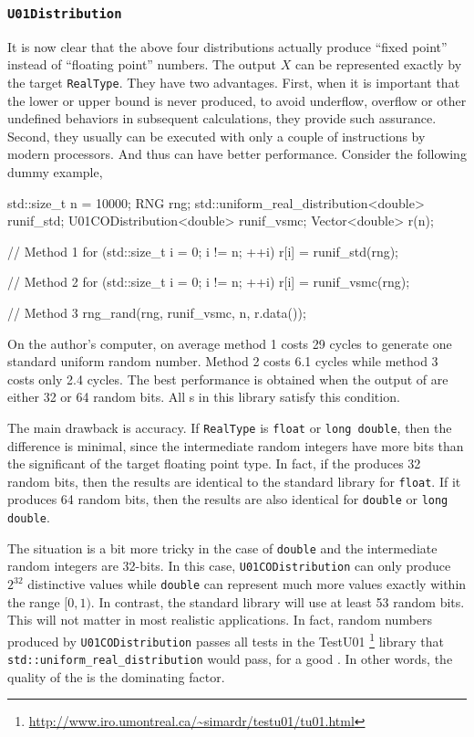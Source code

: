 \subsubsection{\texttt{U01Distribution}}

It is now clear that the above four distributions actually produce ``fixed
point'' instead of ``floating point'' numbers. The output $X$ can be
represented exactly by the target \verb|RealType|. They have two advantages.
First, when it is important that the lower or upper bound is never produced, to
avoid underflow, overflow or other undefined behaviors in subsequent
calculations, they provide such assurance. Second, they usually can be executed
with only a couple of instructions by modern processors. And thus can have
better performance. Consider the following dummy example,
\begin{cppcode}
  std::size_t n = 10000;
  RNG rng;
  std::uniform_real_distribution<double> runif_std;
  U01CODistribution<double> runif_vsmc;
  Vector<double> r(n);

  // Method 1
  for (std::size_t i = 0; i != n; ++i)
      r[i] = runif_std(rng);

  // Method 2
  for (std::size_t i = 0; i != n; ++i)
      r[i] = runif_vsmc(rng);

  // Method 3
  rng_rand(rng, runif_vsmc, n, r.data());
\end{cppcode}
On the author's computer, on average method 1 costs 29 cycles to generate one
standard uniform random number. Method 2 costs 6.1 cycles while method 3 costs
only 2.4 cycles. The best performance is obtained when the output of \rng are
either 32 or 64 random bits. All \rng{}s in this library satisfy this
condition.

The main drawback is accuracy. If \verb|RealType| is \verb|float| or
\verb|long double|, then the difference is minimal, since the intermediate
random integers have more bits than the significant of the target floating
point type. In fact, if the \rng produces 32 random bits, then the results are
identical to the standard library for \verb|float|. If it produces 64 random
bits, then the results are also identical for \verb|double| or
\verb|long double|.

The situation is a bit more tricky in the case of \verb|double| and the
intermediate random integers are 32-bits. In this case,
\verb|U01CODistribution| can only produce $2^{32}$ distinctive values while
\verb|double| can represent much more values exactly within the range $[0, 1)$.
In contrast, the standard library will use at least 53 random bits. This will
not matter in most realistic applications. In fact, random numbers produced by
\verb|U01CODistribution| passes all tests in the
{\lnfigures\tbfigures TestU01}%
\footnote{\url{http://www.iro.umontreal.ca/~simardr/testu01/tu01.html}}
library that \verb|std::uniform_real_distribution| would pass, for a good \rng.
In other words, the quality of the \rng is the dominating factor.

